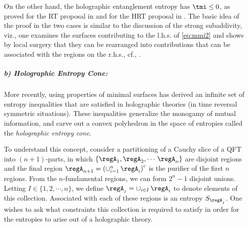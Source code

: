 \documentclass[12pt,openany]{book}
\begin{document}
On the other hand, the holographic entanglement entropy has $\tmi \leq0$, as proved for the RT proposal in \cite{Hayden:2011ag} and for the HRT proposal in \cite{Wall:2012uf}. The basic idea of the proof in the two cases is similar to the discussion of the strong subaddivity, viz., one examines the surfaces contributing to the l.h.s. of \eqref{eq:mmi2} and shows by local surgery that they can be rearranged into contributions that can be associated with the regions on the r.h.s., cf., \cite{Hayden:2011ag,Wall:2012uf}.

\subparagraph{b) Holographic Entropy Cone:} More recently, using properties of minimal surfaces \cite{Bao:2015bfa} has derived an infinite set of entropy inequalities that are satisfied in holographic theories (in time reversal symmetric situations). These inequalities generalize the monogamy of mutual information, and carve out a convex polyhedron in the space of entropies called the \emph{holographic entropy cone}.

 To understand this concept, consider a partitioning of a Cauchy slice of a QFT into $(n+1)$-parts, in which $\{\regA_1, \regA_2, \cdots \, \regA_n\} $ are disjoint regions and the final region $\regA_{n+1} = \left(\cup_{i=1}^n\, \regA_i\right)^c$ is the purifier of the first $n$ regions. From the $n$-fundamental regions, we can form $2^n -1 $ disjoint unions. Letting
 $I \in \{1, 2, \cdots ,n \}$, we define $\regA_{_I} = \cup_{i\in I} \, \regA_i$ to denote elements of this collection.  Associated with each of these regions  is an entropy $S_{\regA_{_I}}$. One wishes to ask what constraints this collection is required to satisfy in order for the entropies to arise out of a holographic theory.
\end{document}

